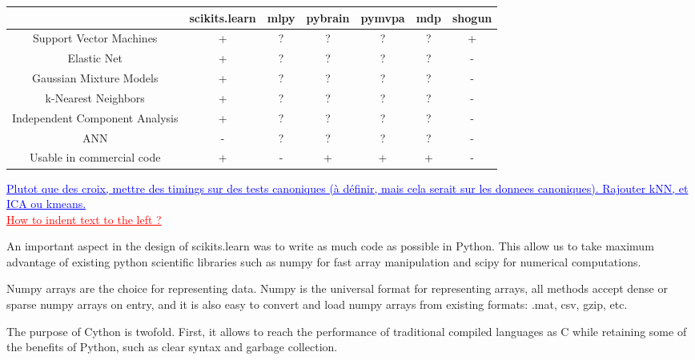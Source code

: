 \documentclass[twoside,11pt]{article}
\newcommand{\GAEL}[1]{\textcolor{blue}{\uline{#1}}}
\newcommand{\FABIAN}[1]{\textcolor{red}{\uline{#1}}}
\begin{document}
\begin{center}


\begin{tabular}{c c c c c c c}
\hline\hline %
 & scikits.learn & mlpy & pybrain & pymvpa &  mdp & shogun \\ [0.5ex]
\hline
Support Vector Machines        & + & ?   & ?       &  ?     & ?    & + \\
Elastic Net & + & ?   & ?       &  ?     & ?    & - \\
Gaussian Mixture Models  & + & ?   & ?       &  ?     & ?    & - \\
k-Nearest Neighbors & + & ?   & ?       &  ?     & ?    & - \\
Independent Component Analysis & + & ?  & ?  & ?  & ?  & - \\
ANN  & - & ?  & ?  & ?  & ?  & - \\
Usable in commercial code &  + & -   & +       &  +     & +    & - \\
\hline
\end{tabular}
\GAEL{Plutot que des croix, mettre des timings sur des tests canoniques (à 
définir, mais cela serait sur les donnees canoniques). Rajouter kNN, et
ICA ou kmeans.}\\
\FABIAN{How to indent text to the left ?}
\end{center}

An important aspect in the design of scikits.learn was to write as
much code as possible in Python. This allow us to take maximum
advantage of existing python scientific libraries such as numpy for
fast array manipulation and scipy for numerical computations.



Numpy arrays are the choice for representing data. Numpy is the
universal format for representing arrays, all methods accept dense or
sparse numpy arrays on entry, and it is also easy to convert and load
numpy arrays from existing formats: .mat, csv, gzip, etc.

The purpose of Cython is twofold. First, it allows to reach the
performance of traditional compiled languages as C while retaining
some of the benefits of Python, such as clear syntax and garbage
collection.
\end{document}
